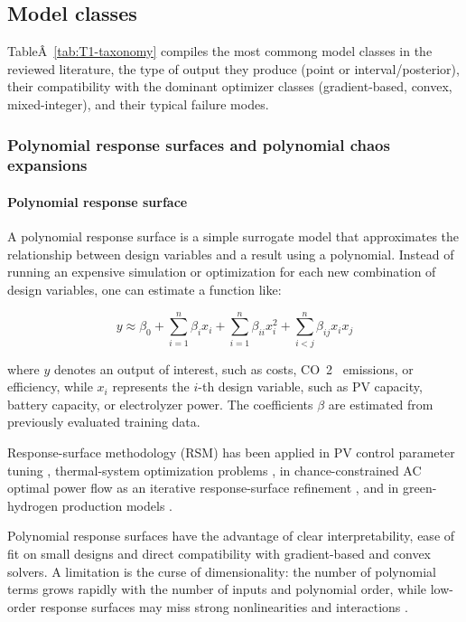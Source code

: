 \subsection{Model classes}
\label{sec:surrogate_classes}

TableÂ~\ref{tab:T1-taxonomy} compiles the most commong model classes in
the reviewed literature, the type of output they produce (point or
interval/posterior), their compatibility with the dominant optimizer
classes (gradient-based, convex, mixed-integer), and their typical
failure modes.

\subsubsection{Polynomial response surfaces and polynomial chaos expansions}
\label{sec:tax:rsm}

\paragraph{Polynomial response surface}

A polynomial response surface is a simple surrogate model that
approximates the relationship between design variables and a result
using a polynomial. Instead of running an expensive simulation or
optimization for each new combination of design variables, one can
estimate a function like:

$$\begin{equation}
 y \approx \beta_0 + \sum_{i=1}^{n} \beta_i x_i + \sum_{i=1}^{n} \beta_{ii} x_i^2 + \sum_{i<j}^{n} \beta_{ij} x_i x_j
\end{equation}$$

where $y$ denotes an output of interest, such as costs, CO~2~ emissions,
or efficiency, while $x_i$ represents the $i$-th design variable, such
as PV capacity, battery capacity, or electrolyzer power. The
coefficients $\beta$ are estimated from previously evaluated training
data.

Response-surface methodology (RSM) has been applied in PV control
parameter tuning \cite{Hasanien2018168}, thermal-system optimization
problems \cite{Sami20181416,Ahmad202451,Sun2020}, in chance-constrained
AC optimal power flow as an iterative response-surface refinement
\cite{Xu20212696}, and in green-hydrogen production models
\cite{Ahmad202451}.

Polynomial response surfaces have the advantage of clear
interpretability, ease of fit on small designs and direct compatibility
with gradient-based and convex solvers. A limitation is the curse of
dimensionality: the number of polynomial terms grows rapidly with the
number of inputs and polynomial order, while low-order response surfaces
may miss strong nonlinearities and interactions
\cite{Torun20192128,Hasanien2018168}.

